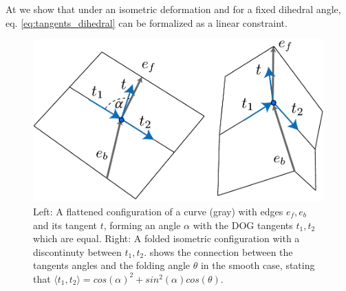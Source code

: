 At  we show that under an isometric deformation and for a fixed dihedral angle, eq. \eqref{eq:tangents_dihedral} can be formalized as a linear constraint.

\begin{figure} [h]
	\centering
	\includegraphics[width=\linewidth]{figures/fold_angle_and_tangent_angles}
	\caption{Left: A flattened configuration of a curve (gray) with edges $e_f,e_b$ and its tangent $t$, forming an angle $\alpha$ with the DOG tangents $t_1,t_2$ which are equal. Right: A folded isometric configuration with a discontinuty between $t_1,t_2$.  shows the connection between the tangents angles and the folding angle $\theta$ in the smooth case, stating that $\langle t_1, t_2 \rangle = cos(\alpha)^2 + sin^2(\alpha) cos(\theta)$. }
	\label{fig:fold_angle_and_tangent_angles}
\end{figure}

